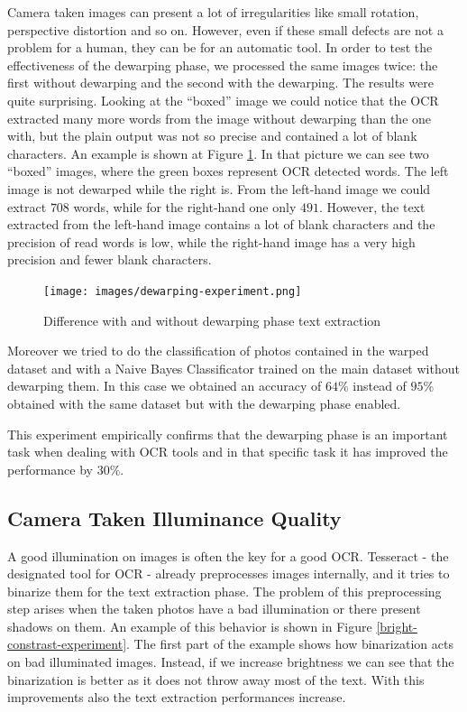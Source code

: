\documentclass[10pt,twocolumn,letterpaper]{article}
\begin{document}
Camera taken images can present a lot of irregularities like small
rotation, perspective distortion and so on. However, even if these
small defects are not a problem for a human, they can be for an
automatic tool. In order to test the effectiveness of the dewarping
phase, we processed the same images twice: the first without dewarping
and the second with the dewarping. The results were quite
surprising. Looking at the ``boxed'' image we could notice that the
OCR extracted many more words from the image without dewarping than
the one with, but the plain output was not so precise and contained a
lot of blank characters. An example is shown at Figure
\ref{dewarping-experiment}. In that picture we can see two ``boxed''
images, where the green boxes represent OCR detected words. The left
image is not dewarped while the right is. From the left-hand image we
could extract $708$ words, while for the right-hand one only
$491$. However, the text extracted from the left-hand image contains a
lot of blank characters and the precision of read words is low, while
the right-hand image has a very high precision and fewer blank
characters.

\begin{figure}[b]
  \centering
  \texttt{[image: images/dewarping-experiment.png]}
  \caption{Difference with and without dewarping phase text extraction}
  \label{dewarping-experiment}
\end{figure}

Moreover we tried to do the classification of photos contained in the
warped dataset and with a Naive Bayes Classificator trained on the
main dataset without dewarping them. In this case we obtained an
accuracy of $64\%$ instead of $95\%$ obtained with the same dataset
but with the dewarping phase enabled.

This experiment empirically confirms that the dewarping phase is an
important task when dealing with OCR tools and in that specific task
it has improved the performance by $30\%$.

\subsection{Camera Taken Illuminance Quality}
\label{subsec:camera-taken-illuminance-quality}

A good illumination on images is often the key for a good
OCR. Tesseract - the designated tool for OCR - already preprocesses
images internally, and it tries to binarize them for the text
extraction phase.  The problem of this preprocessing step arises when
the taken photos have a bad illumination or there present shadows on
them. An example of this behavior is shown in Figure
\ref{bright-constrast-experiment}. The first part of the example shows
how binarization acts on bad illuminated images. Instead, if we
increase brightness we can see that the binarization is better as it
does not throw away most of the text. With this improvements also the
text extraction performances increase.
\end{document}
